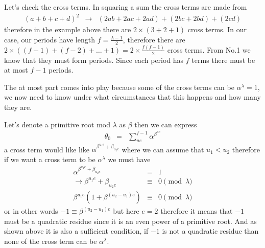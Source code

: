 \documentclass[aps,preprint,preprintnumbers,nofootinbib,showpacs,prd]{revtex4-1}
\newcommand{\nbea}{\begin{eqnarray*}}
\newcommand{\neea}{\end{eqnarray*}}
\begin{document}
\begin{enumerate}
Let's check the cross terms. In squaring a sum the cross terms are made from
%
\nbea
(a + b+ c + d)^2 & \to & (2ab + 2ac + 2ad) + (2bc + 2bd) + (2cd)
\neea
%
therefore in the example above there are $2\times(3 + 2 + 1)$ cross terms. In our case, our periods have length $f = \frac{\lambda - 1}{2}$, therefore there are $2\times((f-1) + (f - 2) + \dots + 1) = 2\times\frac{f(f-1)}{2}$ cross terms. From No.1 we know that they must form periods. Since each period has $f$ terms there must be at most $f-1$ periods.

The at most part comes into play because some of the cross terms can be $\alpha^\lambda = 1$, we now need to know under what circumstances that this happens and how many they are.

Let's denote a primitive root mod $\lambda$ as $\beta$ then we can express
%
\nbea
\theta_0 & = & \sum_{ue}^{f-1} \alpha^{\beta^{ue}}
\neea
%
a cross term would like like $\alpha^{\beta^{u_1 e} + \beta_{u_2 e}}$ where we can assume that $u_1 < u_2$ therefore if we want a cross term to be $\alpha^\lambda$ we must have
%
\nbea
\alpha^{\beta^{u_1 e} + \beta_{u_2 e}} & = & 1 \\
\to \beta^{u_1 e} + \beta_{u_2 e} & \equiv & 0 \pmod{\lambda} \\
\beta^{u_1e}(1 + \beta^{(u_2 - u_1) e}) & \equiv & 0 \pmod{\lambda}
\neea
%
or in other words $-1 \equiv \beta^{(u_2 - u_1) e}$ but here $e = 2$ therefore it means that $-1$ must be a quadratic residue since it is an even power of a primitive root. And as shown above it is also a sufficient condition, if $-1$ is not a quadratic residue than none of the cross term can be $\alpha^\lambda$.


\end{enumerate}
\end{document}
